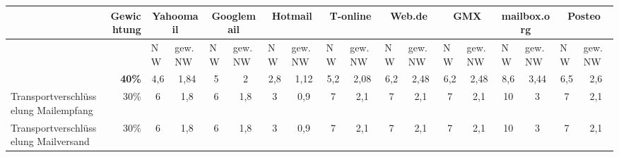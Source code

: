 \thispagestyle{empty}
\begin{landscape}
	\begin{table}
		\small
		\centering
		\renewcommand{\tabularxcolumn}[1]{>{\small}m{#1}}
		\begin{tabularx}{1.62\textwidth}{
		|>{\raggedleft\arraybackslash} p{} %
		|r %
		|X %
		|X %
		|X %
		|X %
		|X %
		|X %
		|X %
		|X %
		|X %
		|X %
		|X %
		|X %
		|X %
		|X %
		|X %
		|X %
		|} 	
		\hline 
		\multicolumn{1}{|l|}{\textbf{Kriterien}}&
		\textbf{Gewichtung}&
		\multicolumn{2}{c|}{Yahoomail}&
		\multicolumn{2}{c|}{Googlemail}&
		\multicolumn{2}{c|}{Hotmail}&
		\multicolumn{2}{c|}{T-online}&
		\multicolumn{2}{c|}{Web.de}&
		\multicolumn{2}{c|}{GMX}&
		\multicolumn{2}{c|}{mailbox.org}&
		\multicolumn{2}{c|}{Posteo}
		\\
		
		\hline 
		&
		&
		NW&
		gew. NW&
		NW&
		gew. NW&
		NW&
		gew. NW&
		NW&
		gew. NW&
		NW&
		gew. NW&
		NW&
		gew. NW&
		NW&
		gew. NW&
		NW&
		gew. NW
		\\
		
		\rowcolor{dunkelgrau}
		\hline 
		\multicolumn{1}{|l|}{\textbf{Vertraulichkeit \& Integrität}}&
		\textbf{40\%}&
		\multicolumn{1}{c|}{4,6}&
		\multicolumn{1}{c|}{1,84}&
		\multicolumn{1}{c|}{5}&
		\multicolumn{1}{c|}{2}&
		\multicolumn{1}{c|}{2,8}&
		\multicolumn{1}{c|}{1,12}&
		\multicolumn{1}{c|}{5,2}&
		\multicolumn{1}{c|}{2,08}&
		\multicolumn{1}{c|}{6,2}&
		\multicolumn{1}{c|}{2,48}&
		\multicolumn{1}{c|}{6,2}&
		\multicolumn{1}{c|}{2,48}&
		\multicolumn{1}{c}{8,6}&
		\multicolumn{1}{c|}{3,44}&
		\multicolumn{1}{c|}{6,5}&
		\multicolumn{1}{c|}{2,6}
		\\

		\hline
		Transportverschlüsselung Mailempfang&
		30\%&
		\multicolumn{1}{c|}{6}&
		\multicolumn{1}{c|}{1,8}&
		\multicolumn{1}{c|}{6}&
		\multicolumn{1}{c|}{1,8}&
		\multicolumn{1}{c|}{3}&
		\multicolumn{1}{c|}{0,9}&
		\multicolumn{1}{c|}{7}&
		\multicolumn{1}{c|}{2,1}&
		\multicolumn{1}{c|}{7}&
		\multicolumn{1}{c|}{2,1}&
		\multicolumn{1}{c|}{7}&
		\multicolumn{1}{c|}{2,1}&
		\multicolumn{1}{c|}{10}&
		\multicolumn{1}{c|}{3}&
		\multicolumn{1}{c|}{7}&
		\multicolumn{1}{c|}{2,1}
		\\

		\hline
		Transportverschlüsselung Mailversand&
		30\%&
		\multicolumn{1}{c|}{6}&
		\multicolumn{1}{c|}{1,8}&
		\multicolumn{1}{c|}{6}&
		\multicolumn{1}{c|}{1,8}&
		\multicolumn{1}{c|}{3}&
		\multicolumn{1}{c|}{0,9}&
		\multicolumn{1}{c|}{7}&
		\multicolumn{1}{c|}{2,1}&
		\multicolumn{1}{c|}{7}&
		\multicolumn{1}{c|}{2,1}&
		\multicolumn{1}{c|}{7}&
		\multicolumn{1}{c|}{2,1}&
		\multicolumn{1}{c|}{10}&
		\multicolumn{1}{c|}{3}&
		\multicolumn{1}{c|}{7}&
		\multicolumn{1}{c|}{2,1}
		\\


\end{tabularx}
\end{table}
\end{landscape}
